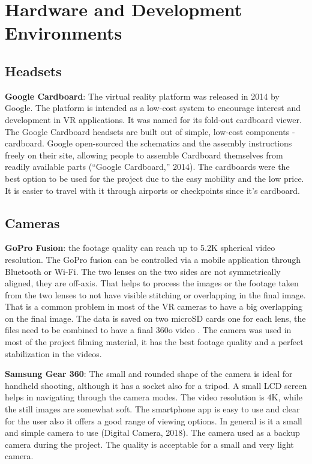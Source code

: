 
\section{Hardware and Development Environments}
\subsection{Headsets}
\textbf{Google Cardboard}: The virtual reality platform was released in
2014 by Google. The platform is intended as a low-cost system to
encourage interest and development in VR applications. It was
named for its fold-out cardboard viewer. The Google Cardboard
headsets are built out of simple, low-cost components -
cardboard. Google open-sourced the schematics and the
assembly instructions freely on their site, allowing people to
assemble Cardboard themselves from readily available parts (“Google Cardboard,” 2014). The
cardboards were the best option to be used for the project due to the easy mobility and the
low price. It is easier to travel with it through airports or checkpoints since it’s cardboard.
\subsection{Cameras}
\textbf{GoPro Fusion}: the footage quality can reach up to 5.2K spherical video
resolution. The GoPro fusion can be controlled via a mobile
application through Bluetooth or Wi-Fi. The two lenses on the two
sides are not symmetrically aligned, they are off-axis. That helps to
process the images or the footage taken from the two lenses to not
have visible stitching or overlapping in the final image. That is a
common problem in most of the VR cameras to have a big overlapping on the final image. The
data is saved on two microSD cards one for each lens, the files need to be combined to have
a final 360o video \citep{Easton2018}. The camera was used in most of the project filming material,
it has the best footage quality and a perfect stabilization in the videos.


\textbf{Samsung Gear 360}: The small and rounded shape of the camera is ideal for
handheld shooting, although it has a socket also for a tripod. A small LCD
screen helps in navigating through the camera modes. The video resolution is
4K, while the still images are somewhat soft. The smartphone app is easy to
use and clear for the user also it offers a good range of viewing options. In
general is it a small and simple camera to use (Digital Camera, 2018). The
camera used as a backup camera during the project. The quality is acceptable
for a small and very light camera.

